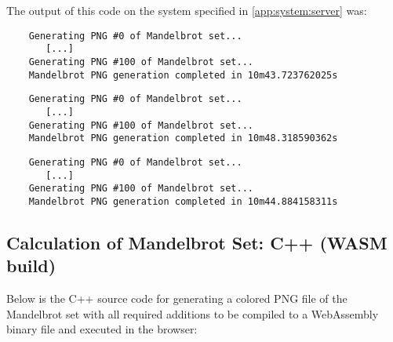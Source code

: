 The output of this code on the system specified in \ref{app:system:server} was:
\begin{lstlisting}
    Generating PNG #0 of Mandelbrot set...
       [...]
    Generating PNG #100 of Mandelbrot set...
    Mandelbrot PNG generation completed in 10m43.723762025s
\end{lstlisting}
\begin{lstlisting}
    Generating PNG #0 of Mandelbrot set...
       [...]
    Generating PNG #100 of Mandelbrot set...
    Mandelbrot PNG generation completed in 10m48.318590362s
\end{lstlisting}
\begin{lstlisting}
    Generating PNG #0 of Mandelbrot set...
       [...]
    Generating PNG #100 of Mandelbrot set...
    Mandelbrot PNG generation completed in 10m44.884158311s
\end{lstlisting}

\subsection{Calculation of Mandelbrot Set: C++ (WASM build)}
\label{app:code:mandelbrot4}
Below is the C++ source code for generating a colored PNG file of the Mandelbrot set with all required additions to be compiled to a WebAssembly binary file and executed in the browser:

